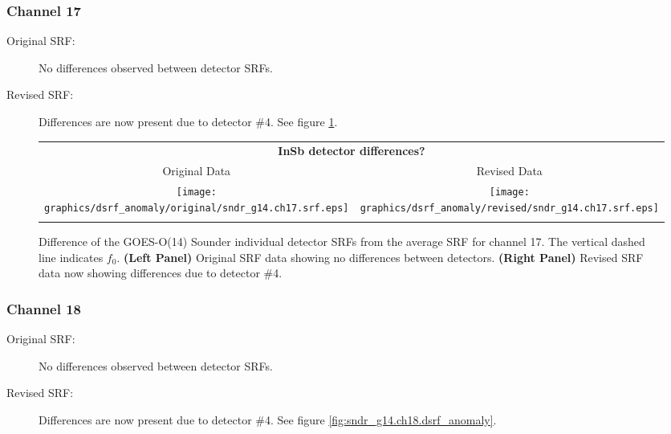 \subsubsection{Channel 17}
\begin{description}
  \item[Original SRF:] No differences observed between detector SRFs.
  \item[Revised SRF:]  Differences are now present due to detector \#4. See figure \ref{fig:sndr_g14.ch17.dsrf_anomaly}.
\end{description}

\begin{figure}[htp]
  \centering
  \begin{tabular}{c c}
    \multicolumn{2}{c}{\textsf{\bfseries InSb detector differences?}} \\
    \hspace{1.5em}\textsf{Original Data} &
    \hspace{1.5em}\textsf{Revised Data} \\
    \texttt{[image: graphics/dsrf\_anomaly/original/sndr\_g14.ch17.srf.eps]} &
    \texttt{[image: graphics/dsrf\_anomaly/revised/sndr\_g14.ch17.srf.eps]} \\\\
  \end{tabular}
  \caption{Difference of the GOES-O(14) Sounder individual detector SRFs from the average SRF for channel 17. The vertical dashed line indicates $f_0$. \textbf{(Left Panel)} Original SRF data showing no differences between detectors. \textbf{(Right Panel)} Revised SRF data now showing differences due to detector \#4.}
  \label{fig:sndr_g14.ch17.dsrf_anomaly}
\end{figure}

\subsubsection{Channel 18}
\begin{description}
  \item[Original SRF:] No differences observed between detector SRFs.
  \item[Revised SRF:]  Differences are now present due to detector \#4. See figure \ref{fig:sndr_g14.ch18.dsrf_anomaly}.
\end{description}

